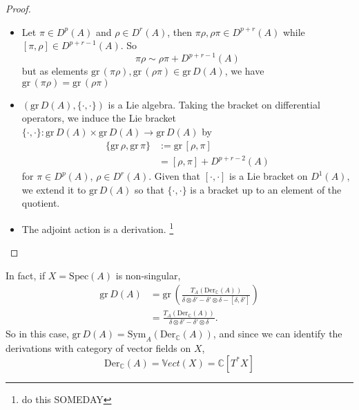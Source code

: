 \label{prop:grading_is_poisson}
\begin{proof}
\begin{itemize}
    \item Let $\pi \in D^p(A)$ and $\rho \in D^r(A)$, then $\pi \rho, \rho \pi \in D^{p+r}(A)$ while $[\pi, \rho] \in D^{p+r-1}(A)$.
    So 
    \begin{equation}
        \pi \rho \sim \rho \pi + D^{p+r-1}(A)
    \end{equation}
    but as elements $\mathrm{gr}\,(\pi \rho), \mathrm{gr}\,(\rho \pi) \in \mathrm{gr} \, D(A)$, we have $\mathrm{gr}\,(\pi \rho) = \mathrm{gr}\,(\rho \pi)$
    \item $\left(\mathrm{gr} \, D(A), \{\cdot, \cdot\} \right)$ is a Lie algebra. 
    Taking the bracket on differential operators, we induce the Lie bracket $\{\cdot,\cdot\} : \mathrm{gr}\, D(A) \times \mathrm{gr}\, D(A) \rightarrow \mathrm{gr}\, D(A) $ by 
    \begin{align*}
        \{\mathrm{gr} \,\rho, \mathrm{gr}\, \pi\} &:= \mathrm{gr}\,  [\rho, \pi] \\
        &= [\rho,\pi] + D^{p+r-2}(A)
    \end{align*}
    for $\pi \in D^p(A)$, $\rho \in D^r(A)$. Given that $[\cdot,\cdot]$ is a Lie bracket on $D^1(A)$, we extend it to $\mathrm{gr} \, D(A)$ so that $\{\cdot, \cdot\}$ is a bracket up to an element of the quotient. 
    \item The adjoint action is a derivation. 
    \footnote{
        do this SOMEDAY
    }
\end{itemize}

\end{proof}

In fact, if $X = \mathrm{Spec}(A)$ is non-singular,
\begin{align*}
    \mathrm{gr}\, D(A) &= \mathrm{gr}\, \left( \frac{T_A(\mathrm{Der}_\mathbb{C}(A))}{\delta \otimes \delta' - \delta' \otimes \delta - [\delta,\delta']}  \right)\\
    &= \frac{T_A(\mathrm{Der}_\mathbb{C}(A))}{\delta \otimes \delta' - \delta' \otimes \delta}.
\end{align*}
So in this case, $\mathrm{gr}\, D(A) = \mathrm{Sym}_A(\mathrm{Der}_\mathbb{C}(A))$, and since we can identify the derivations with category of vector fields on $X$,
\begin{equation}
    \mathrm{Der}_\mathbb{C}(A) = \mathbb{V}ect(X) = \mathbb{C}[T^*X]
\end{equation}

